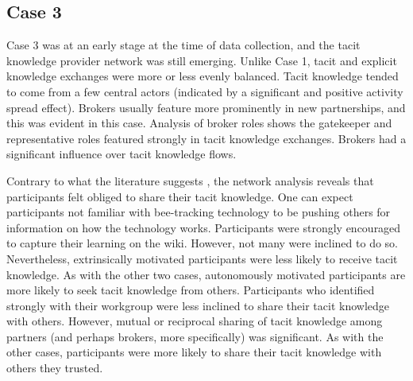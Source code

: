 \subsection{Case 3}

Case 3 was at an early stage at the time of data collection, and the tacit knowledge provider network was still emerging. Unlike Case 1, tacit and explicit knowledge exchanges were more or less evenly balanced. Tacit knowledge tended to come from a few central actors (indicated by a significant and positive activity spread effect). Brokers usually feature more prominently in new partnerships, and this was evident in this case. Analysis of broker roles shows the gatekeeper and representative roles featured strongly in tacit knowledge exchanges. Brokers had a significant influence over tacit knowledge flows. \medskip   

Contrary to what the literature suggests \citep[e.g.][]{osterloh2000motivation,kaser2001knowledge,obrenovic2020enjoyment}, the network analysis reveals that participants felt obliged to share their tacit knowledge. One can expect participants not familiar with bee-tracking technology to be pushing others for information on how the technology works. Participants were strongly encouraged to capture their learning on the wiki. However, not many were inclined to do so. Nevertheless, extrinsically motivated participants were less likely to receive tacit knowledge. As with the other two cases, autonomously motivated participants are more likely to seek tacit knowledge from others. Participants who identified strongly with their workgroup were less inclined to share their tacit knowledge with others. However, mutual or reciprocal sharing of tacit knowledge among partners (and perhaps brokers, more specifically) was significant. As with the other cases, participants were more likely to share their tacit knowledge with others they trusted. \medskip

